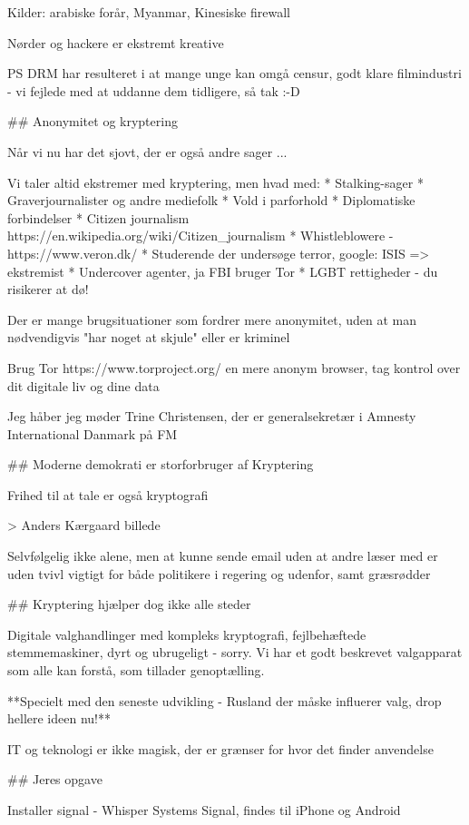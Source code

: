 \documentclass[20pt,landscape,a4paper,footrule]{foils}
\begin{document}
Kilder: arabiske forår, Myanmar, Kinesiske firewall

\centerline{Nørder og hackere er ekstremt kreative}

PS DRM har resulteret i at mange unge kan omgå censur, godt klare filmindustri - vi fejlede med at uddanne dem tidligere, så tak :-D

## Anonymitet og kryptering

Når vi nu har det sjovt, der er også andre sager ...

Vi taler altid ekstremer med kryptering, men hvad med:
* Stalking-sager
* Graverjournalister og andre mediefolk
* Vold i parforhold
* Diplomatiske forbindelser
* Citizen journalism https://en.wikipedia.org/wiki/Citizen_journalism
* Whistleblowere - https://www.veron.dk/
* Studerende der undersøge terror, google: ISIS => ekstremist
* Undercover agenter, ja FBI bruger Tor
* LGBT rettigheder - du risikerer at dø!


Der er mange brugsituationer som fordrer mere anonymitet, uden at man nødvendigvis "har noget at skjule" eller er kriminel

Brug Tor https://www.torproject.org/ en mere anonym browser, tag kontrol over dit digitale liv og dine data

Jeg håber jeg møder Trine Christensen, der er generalsekretær i Amnesty International Danmark på FM

## Moderne demokrati er storforbruger af Kryptering

Frihed til at tale er også kryptografi

> Anders Kærgaard billede

Selvfølgelig ikke alene, men at kunne sende email uden at andre læser med er uden tvivl vigtigt for både politikere i regering og udenfor, samt græsrødder

## Kryptering hjælper dog ikke alle steder

Digitale valghandlinger med kompleks kryptografi, fejlbehæftede stemmemaskiner, dyrt og ubrugeligt - sorry. Vi har et godt beskrevet valgapparat som alle kan forstå, som tillader genoptælling.

**Specielt med den seneste udvikling - Rusland der måske influerer valg, drop hellere ideen nu!**

IT og teknologi er ikke magisk, der er grænser for hvor det finder anvendelse

## Jeres opgave

Installer signal - Whisper Systems Signal, findes til iPhone og Android
\end{document}
